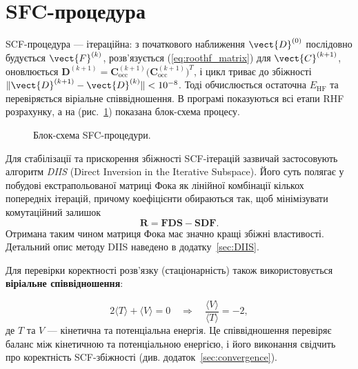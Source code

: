 \section{SFC-процедура}

SCF-процедура --- ітераційна: з початкового наближення $\vect{D}^{(0)}$ послідовно будується $\vect{F}^{(k)}$, розв'язується (\ref{eq:roothf_matrix}) для $\vect{C}^{(k+1)}$, оновлюється $\mathbf D^{(k+1)} =  \mathbf C_{\mathrm{occ}}^{(k+1)} \big(\mathbf C_{\mathrm{occ}}^{(k+1)}\big)^{\!T}$, і цикл триває до збіжності $\| \vect{D}^{(k+1)} - \vect{D}^{(k)} \| < 10^{-8}$. Тоді обчислюється остаточна $E_{\text{HF}}$ та перевіряється віріальне співвідношення. В програмі  показуються всі етапи RHF розрахунку, а на (рис.~\ref{tikz:diagramm}) показана блок-схема процесу.

\begin{figure}[h!]\centering
	
	\caption{Блок-схема SFC-процедури.}
	\label{tikz:diagramm}
\end{figure}

\begin{commentbox}
	Для стабілізації та прискорення збіжності SCF-ітерацій зазвичай
	застосовують алгоритм \textit{DIIS} (Direct Inversion in the Iterative
	Subspace). Його суть полягає у побудові екстрапольованої матриці Фока
	як лінійної комбінації кількох попередніх ітерацій, причому коефіцієнти
	обираються так, щоб мінімізувати комутаційний залишок
	\[
		\mathbf R = \mathbf F\mathbf D\mathbf S - \mathbf S\mathbf D\mathbf F.
	\]
	Отримана таким чином матриця Фока має значно кращі збіжні властивості.
	Детальний опис методу DIIS наведено в додатку~\ref{sec:DIIS}.
\end{commentbox}


Для перевірки коректності розв'язку (стаціонарність) також використовується \textbf{віріальне співвідношення}:

\[
	2 \langle T \rangle + \langle V \rangle = 0 \quad \Rightarrow \quad \frac{\langle V \rangle}{\langle T \rangle} = -2,
\]
%
де $T$ та $V$ --- кінетична та потенціальна енергія. Це співвідношення перевіряє баланс між кінетичною та потенціальною енергією, і його виконання свідчить про коректність SCF-збіжності (див. додаток~\ref{sec:convergence}).


